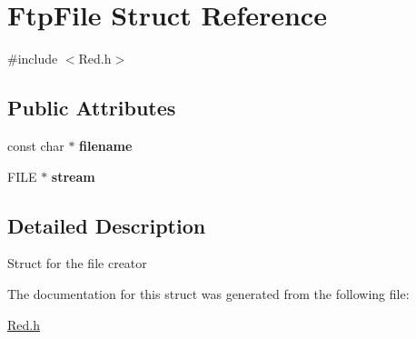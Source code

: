 \hypertarget{structFtpFile}{}\section{Ftp\+File Struct Reference}
\label{structFtpFile}


{\ttfamily \#include $<$Red.\+h$>$}

\subsection*{Public Attributes}
\begin{DoxyCompactItemize}
\item 
const char $\ast$ {\bfseries filename}\hypertarget{structFtpFile_a4723ce436f939230fdf49dd1d01603c6}{}\label{structFtpFile_a4723ce436f939230fdf49dd1d01603c6}

\item 
F\+I\+LE $\ast$ {\bfseries stream}\hypertarget{structFtpFile_a85607ef8181fea03cbba4efeff2a7f87}{}\label{structFtpFile_a85607ef8181fea03cbba4efeff2a7f87}

\end{DoxyCompactItemize}


\subsection{Detailed Description}
Struct for the file creator 

The documentation for this struct was generated from the following file\+:\begin{DoxyCompactItemize}
\item 
\hyperlink{Red_8h}{Red.\+h}\end{DoxyCompactItemize}
